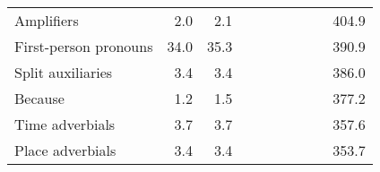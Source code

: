 \begin{table}[!t]
\begin{tabular*}{\linewidth}{@{\extracolsep{\fill}}lrrrrrrrrr}
Amplifiers & 2.0 & 2.1 & {\cellcolor[HTML]{F4A582}{\textcolor[HTML]{000000}{63\%}}} & {\cellcolor[HTML]{D6604D}{\textcolor[HTML]{FFFFFF}{46\%}}} & {\cellcolor[HTML]{D6604D}{\textcolor[HTML]{FFFFFF}{40\%}}} & {\cellcolor[HTML]{D6604D}{\textcolor[HTML]{FFFFFF}{45\%}}} & {\cellcolor[HTML]{FDDBC7}{\textcolor[HTML]{000000}{85\%}}} & {\cellcolor[HTML]{FDDBC7}{\textcolor[HTML]{000000}{85\%}}} & 404.9 \\ 
First-person pronouns & 34.0 & 35.3 & {\cellcolor[HTML]{FDDBC7}{\textcolor[HTML]{000000}{81\%}}} & {\cellcolor[HTML]{F4A582}{\textcolor[HTML]{000000}{62\%}}} & {\cellcolor[HTML]{D1E5F0}{\textcolor[HTML]{000000}{111\%}}} & {\cellcolor[HTML]{F7F7F7}{\textcolor[HTML]{000000}{108\%}}} & {\cellcolor[HTML]{92C5DE}{\textcolor[HTML]{000000}{136\%}}} & {\cellcolor[HTML]{D1E5F0}{\textcolor[HTML]{000000}{127\%}}} & 390.9 \\ 
Split auxiliaries & 3.4 & 3.4 & {\cellcolor[HTML]{F7F7F7}{\textcolor[HTML]{000000}{91\%}}} & {\cellcolor[HTML]{FDDBC7}{\textcolor[HTML]{000000}{77\%}}} & {\cellcolor[HTML]{D1E5F0}{\textcolor[HTML]{000000}{126\%}}} & {\cellcolor[HTML]{D1E5F0}{\textcolor[HTML]{000000}{118\%}}} & {\cellcolor[HTML]{F7F7F7}{\textcolor[HTML]{000000}{98\%}}} & {\cellcolor[HTML]{F7F7F7}{\textcolor[HTML]{000000}{92\%}}} & 386.0 \\ 
Because & 1.2 & 1.5 & {\cellcolor[HTML]{B2182B}{\textcolor[HTML]{FFFFFF}{19\%}}} & {\cellcolor[HTML]{B2182B}{\textcolor[HTML]{FFFFFF}{20\%}}} & {\cellcolor[HTML]{D6604D}{\textcolor[HTML]{FFFFFF}{38\%}}} & {\cellcolor[HTML]{D6604D}{\textcolor[HTML]{FFFFFF}{38\%}}} & {\cellcolor[HTML]{D1E5F0}{\textcolor[HTML]{000000}{121\%}}} & {\cellcolor[HTML]{F7F7F7}{\textcolor[HTML]{000000}{105\%}}} & 377.2 \\ 
Time adverbials & 3.7 & 3.7 & {\cellcolor[HTML]{FDDBC7}{\textcolor[HTML]{000000}{77\%}}} & {\cellcolor[HTML]{FDDBC7}{\textcolor[HTML]{000000}{79\%}}} & {\cellcolor[HTML]{F4A582}{\textcolor[HTML]{000000}{68\%}}} & {\cellcolor[HTML]{F4A582}{\textcolor[HTML]{000000}{70\%}}} & {\cellcolor[HTML]{D1E5F0}{\textcolor[HTML]{000000}{115\%}}} & {\cellcolor[HTML]{D1E5F0}{\textcolor[HTML]{000000}{119\%}}} & 357.6 \\ 
Place adverbials & 3.4 & 3.4 & {\cellcolor[HTML]{92C5DE}{\textcolor[HTML]{000000}{146\%}}} & {\cellcolor[HTML]{92C5DE}{\textcolor[HTML]{000000}{144\%}}} & {\cellcolor[HTML]{F7F7F7}{\textcolor[HTML]{000000}{101\%}}} & {\cellcolor[HTML]{F7F7F7}{\textcolor[HTML]{000000}{99\%}}} & {\cellcolor[HTML]{D1E5F0}{\textcolor[HTML]{000000}{118\%}}} & {\cellcolor[HTML]{D1E5F0}{\textcolor[HTML]{000000}{128\%}}} & 353.7 \\ 

\end{tabular*}
\end{table}
